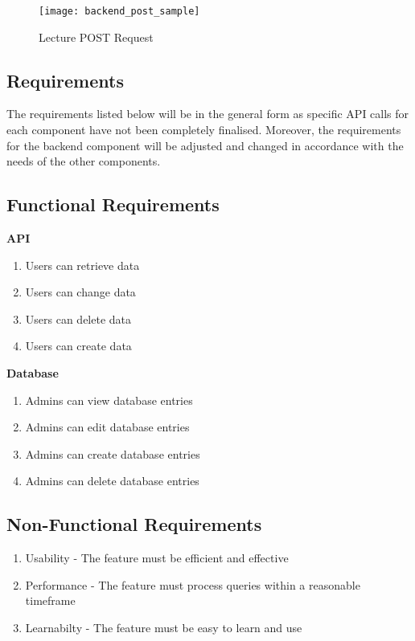 \begin{figure}[h!]
  \centering
  \texttt{[image: backend\_post\_sample]}
  \caption{Lecture POST Request}
\end{figure}

\subsection{Requirements}
The requirements listed below will be in the general form as specific API calls for each 
component have not been completely finalised. Moreover, the requirements for the backend 
component will be adjusted and changed in accordance with the needs of the other components. 

\subsection{Functional Requirements}

\textbf{API}
    \begin{enumerate}
    \item Users can retrieve data
    \item Users can change data
    \item Users can delete data
    \item Users can create data
    \end{enumerate}

\textbf{Database}
    \begin{enumerate}
    \item Admins can view database entries
    \item Admins can edit database entries
    \item Admins can create database entries
    \item Admins can delete database entries
    \end{enumerate}

\subsection{Non-Functional Requirements}
  \begin{enumerate}
    \item Usability - The feature must be efficient and effective
    \item Performance - The feature must process queries within a reasonable timeframe
    \item Learnabilty - The feature must be easy to learn and use
    \end{enumerate}

